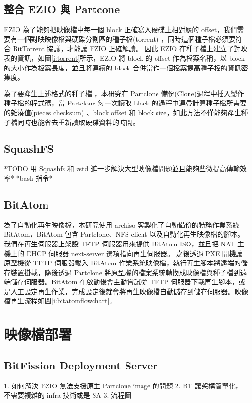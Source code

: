 \subsection{整合 EZIO 與 Partcone}

EZIO 為了能夠把映像檔中每一個 block 正確寫入硬碟上相對應的 offset，我們需要有一個對映映像檔與硬碟分割區的種子檔(torrent) ，同時這個種子檔必須要符合 BitTorrent 協議，才能讓 EZIO 正確解讀。
因此 EZIO 在種子檔上建立了對映表的資訊，如圖\ref{i:torrent}所示，EZIO 將 block 的 offset 作為檔案名稱，以 block 的大小作為檔案長度，並且將連續的 block 合併當作一個檔案提高種子檔的資訊密集度。


為了要產生上述格式的種子檔 ，本研究在 Partclone 備份(Clone)過程中插入製作種子檔的程式碼，當 Partclone 每一次讀取 block 的過程中連帶計算種子檔所需要的雜湊值(pieces checksum) 、block offset 和 block size，如此方法不僅能夠產生種子檔同時也能省去重新讀取硬碟資料的時間。


\subsection{SquashFS}
*TODO 用 Squashfs 和 zstd 進一步解決大型映像檔問題並且能夠些微提高傳輸效率*
*bash 指令*


\subsection{BitAtom}



為了自動化再生映像檔，本研究使用 archiso 客製化了自動備份的特務作業系統 BitAtom，BitAtom 包含 Partclone、NFS client 以及自動化再生映像檔的腳本。
我們在再生伺服器上架設 TFTP 伺服器用來提供 BitAtom ISO，並且把 NAT 主機上的 DHCP 伺服器 next-server 選項指向再生伺服器。
之後透過 PXE 開機讓原型機從 TFTP 伺服器載入 BitAtom 作業系統映像檔，執行再生腳本將遠端的儲存裝置掛載，隨後透過 Partclone 將原型機的檔案系統轉換成映像檔與種子檔到遠端儲存伺服器。BitAtom 在啟動後會主動嘗試從 TFTP 伺服器下載再生腳本，或是人工設定再生作業，完成設定後就會將再生映像檔自動儲存到儲存伺服器。映像檔再生流程如圖\ref{i:bitatomflowchart}。


\section{映像檔部署}
\subsection{BitFission Deployment Server}
1. 如何解決 EZIO 無法支援原生 Partclone image 的問題
2. BT 讓架構簡單化，不需要複雜的 infra 技術或是 SA 
3. 流程圖


